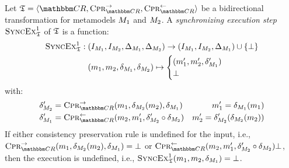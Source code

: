 \begin{definition}
    \label{def:synchronizingtransformationexecutionstep}
    Let $\transformation{T} = \tupled{\consistencyrelationset{CR}, \consistencypreservationrule{\consistencyrelationset{CR}}^{\rightarrow}, \consistencypreservationrule{\consistencyrelationset{CR}}^{\leftarrow}}$ be a bidirectional transformation for metamodels $M_{1}$ and $M_{2}$.
    A \emph{synchronizing execution step} $\textsc{SyncEx}_{\mathfrak{T}}^1$ of $\mathfrak{T}$ is a function:
    \begin{align*}
        \textsc{SyncEx}_{\mathfrak{T}}^1 : \; & (I_{M_{1}}, I_{M_{2}}, \Delta_{M_{1}}, \Delta_{M_{2}}) \rightarrow (I_{M_{1}}, I_{M_{2}}, \Delta_{M_{1}}) \cup \{ \bot \} \\
        & (m_{1}, m_{2}, \delta_{M_{1}}, \delta_{M_{2}}) \mapsto 
        \begin{cases} 
            (m_{1}', m_{2}', \delta_{M_{1}}') \\
            \bot
        \end{cases}
    \end{align*}
    with:
    \begin{align*}
        & \change{\metamodel{M}{2}}' = \consistencypreservationrule{\consistencyrelationset{CR}}^{\rightarrow}(\model{m}{1}, \change{\metamodel{M}{2}}(\model{m}{2}), \change{\metamodel{M}{1}}) %
        & \model{m}{1}' = \change{\metamodel{M}{1}}(\model{m}{1}) \\
        & \change{\metamodel{M}{1}}' = \consistencypreservationrule{\consistencyrelationset{CR}}^{\leftarrow}(\model{m}{2}, \model{m}{1}', \change{\metamodel{M}{2}}' \concatfunction \change{\metamodel{M}{2}}) %
        & \model{m}{2}' = \change{\metamodel{M}{2}}'(\change{\metamodel{M}{2}}(\model{m}{2}))
    \end{align*}
    If either consistency preservation rule is undefined for the input, i.e., $\consistencypreservationrule{\consistencyrelationset{CR}}^{\rightarrow}(\model{m}{1}, \change{\metamodel{M}{2}}(\model{m}{2}), \change{\metamodel{M}{1}}) = \bot$ or $\consistencypreservationrule{\consistencyrelationset{CR}}^{\leftarrow}(\model{m}{2}, \model{m}{1}', \change{\metamodel{M}{2}}' \concatfunction \change{\metamodel{M}{2}}) \bot$, then the execution is undefined, i.e., $\textsc{SyncEx}_{\mathfrak{T}}^1(m_{1}, m_{2}, \delta_{M_{1}}) = \bot$.

\end{definition}

